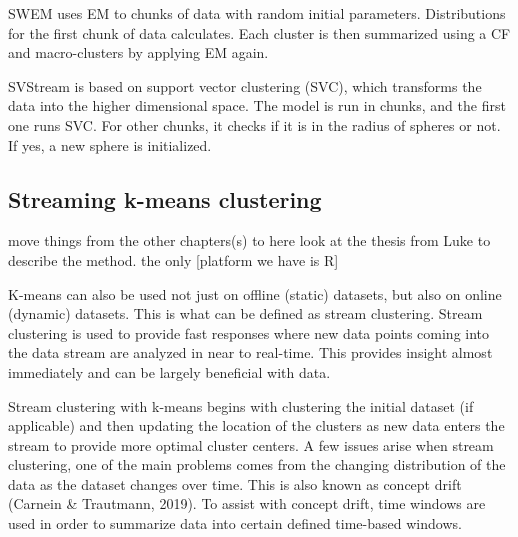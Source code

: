 \documentclass[../UNBThesis2.tex]{subfiles}
\begin{document}
\begin{itemize}
SWEM \cite{dang2009based} uses EM to chunks of data with random initial parameters. Distributions for the first chunk of data calculates. Each cluster is then summarized using a CF and macro-clusters by applying EM again.

SVStream \cite{wang2011svstream} is based on support vector clustering (SVC), which transforms the data into the higher dimensional space. The model is run in chunks, and the first one runs SVC. For other chunks, it checks if it is in the radius of spheres or not. If yes, a new sphere is initialized. 






\end{itemize}

\subsection{Streaming k-means clustering}

move things from the other chapters(s) to here
look at the thesis from Luke to describe the method. the only [platform we have is R]
   	    

K-means can also be used not just on offline (static) datasets, but also on online (dynamic) datasets. This is what can be defined as stream clustering. Stream clustering is used to provide fast responses where new data points coming into the data stream are analyzed in near to real-time. This provides insight almost immediately and can be largely beneficial with data.
  	    
Stream clustering with k-means begins with clustering the initial dataset (if applicable) and then updating the location of the clusters as new data enters the stream to provide more optimal cluster centers. A few issues arise when stream clustering, one of the main problems comes from the changing distribution of the data as the dataset changes over time. This is also known as concept drift (Carnein & Trautmann, 2019). To assist with concept drift, time windows are used in order to summarize data into certain defined time-based windows.

         
\end{document}

